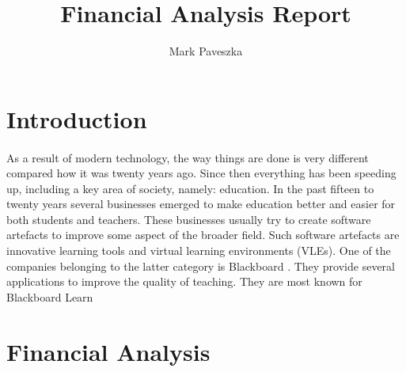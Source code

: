 \documentclass[]{article}
\title{Financial Analysis Report}
\author{Mark Paveszka}
\begin{document}
\maketitle

\newpage

\begin{abstract}
\end{abstract}

\newpage

\tableofcontents

\newpage

\section{Introduction}
\paragraph{}
As a result of modern technology, the way things are done is very different compared how it was twenty years ago. Since then everything has been speeding up, including a key area of society, namely: education. In the past fifteen to twenty years several businesses emerged to make education better and easier for both students and teachers. These businesses usually try to create software artefacts to improve some aspect of the broader field. Such software artefacts are innovative learning tools and virtual learning environments (VLEs). One of the companies belonging to the latter category is Blackboard \cite{Blackboard_UK}. They provide several applications to improve the quality of teaching. They are most known for Blackboard Learn \cite{Blackboard_Learn}

\section{Financial Analysis}

\newpage

\printbibliography{}
\end{document}
